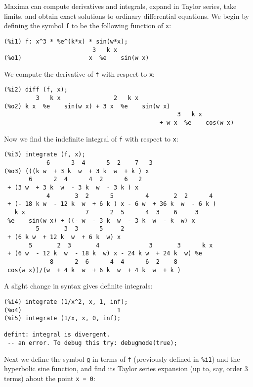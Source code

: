 \documentclass[a4paper,12pt]{article}
\begin{document}
Maxima can compute derivatives and integrals, expand in Taylor series,
take limits, and obtain exact solutions to ordinary differential
equations.  We begin by defining the symbol {\tt f} to be the
following function of {\tt x}:
\begin{verbatim}
(%i1) f: x^3 * %e^(k*x) * sin(w*x);
                         3   k x
(%o1)                   x  %e    sin(w x)
\end{verbatim}
We compute the derivative of {\tt f} with respect to {\tt x}:
\begin{verbatim}
(%i2) diff (f, x);
         3   k x               2   k x
(%o2) k x  %e    sin(w x) + 3 x  %e    sin(w x)
                                                 3   k x
                                            + w x  %e    cos(w x)
\end{verbatim}
Now we find the indefinite integral of {\tt f} with respect to {\tt x}:
\begin{verbatim}
(%i3) integrate (f, x);
            6      3  4      5  2    7   3
(%o3) (((k w  + 3 k  w  + 3 k  w  + k ) x
       6      2  4      4  2      6   2
 + (3 w  + 3 k  w  - 3 k  w  - 3 k ) x
            4       3  2      5         4       2  2      4
 + (- 18 k w  - 12 k  w  + 6 k ) x - 6 w  + 36 k  w  - 6 k )
   k x                 7      2  5      4  3    6     3
 %e    sin(w x) + ((- w  - 3 k  w  - 3 k  w  - k  w) x
         5       3  3      5     2
 + (6 k w  + 12 k  w  + 6 k  w) x
       5       2  3       4              3       3      k x
 + (6 w  - 12 k  w  - 18 k  w) x - 24 k w  + 24 k  w) %e
             8      2  6      4  4      6  2    8
 cos(w x))/(w  + 4 k  w  + 6 k  w  + 4 k  w  + k )
\end{verbatim}
A slight change in syntax gives definite integrals:
\begin{verbatim}
(%i4) integrate (1/x^2, x, 1, inf);
(%o4)                           1
(%i5) integrate (1/x, x, 0, inf);

defint: integral is divergent.
 -- an error. To debug this try: debugmode(true);
\end{verbatim}
Next we define the symbol {\tt g} in terms of {\tt f} (previously
defined in {\tt \%i1}) and the hyperbolic sine function, and find its
Taylor series expansion (up to, say, order 3 terms) about the point
{\tt x = 0}:
\end{document}
